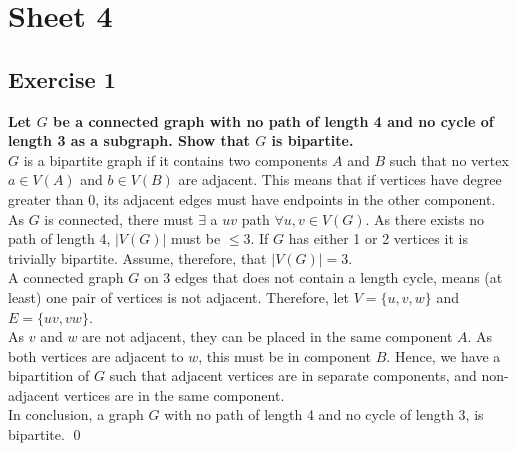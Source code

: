 \section*{Sheet 4}
\subsection*{Exercise 1}
\boldmath
\textbf{Let $G$ be a connected graph with no path of length 4 and no cycle of length 3 as a subgraph. Show that $G$ is bipartite.} \\
\unboldmath
\linebreak 
$G$ is a bipartite graph if it contains two components $A$ and $B$ such that no vertex $a \in V(A)$ and $b \in V(B)$ are adjacent. This means that if vertices have degree greater than 0, its adjacent edges must have endpoints in the other component. \\
\linebreak 
As $G$ is connected, there must $\exists$ a $uv$ path $\forall u, v \in V(G)$. As there exists no path of length 4, $|V(G)|$ must be $\leq 3$. If $G$ has either 1 or 2 vertices it is trivially bipartite. Assume, therefore, that $|V(G)| = 3$. \\
\linebreak 
A connected graph $G$ on 3 edges that does not contain a length cycle, means (at least) one pair of vertices is not adjacent. Therefore, let $V = \{u, v, w\}$ and $E = \{uv, vw\}$. \\
\linebreak 
As $v$ and $w$ are not adjacent, they can be placed in the same component $A$. As both vertices are adjacent to $w$, this must be in component $B$. Hence, we have a bipartition of $G$ such that adjacent vertices are in separate components, and non-adjacent vertices are in the same component. \\
\linebreak
In conclusion, a graph $G$ with no path of length 4 and no cycle of length 3, is bipartite. \qed